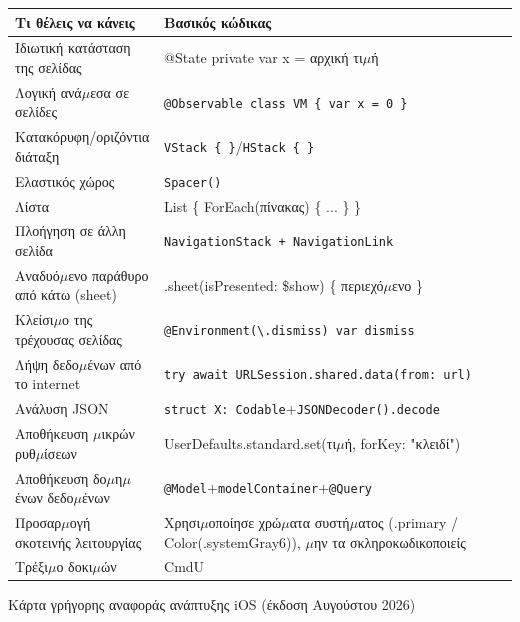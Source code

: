 


\begin{center}
\begin{tabularx}{\linewidth}{|X|X|}
\hline
\textbf{Τι θέλεις να κάνεις} & \textbf{Βασικός κώδικας} \tabularnewline
\hline
Ιδιωτική κατάσταση της σελίδας & @State private var x = αρχική τι$\mu$ή \tabularnewline
Λογική ανά$\mu$εσα σε σελίδες & \texttt{@Observable class VM \{ var x = 0 \}} \tabularnewline
Κατακόρυφη/οριζόντια διάταξη & \texttt{VStack \{ \}}/\texttt{HStack \{ \}} \tabularnewline
Ελαστικός χώρος & \texttt{Spacer()} \tabularnewline
Λίστα & List \{ ForEach(πίνακας) \{ ... \} \} \tabularnewline
Πλοήγηση σε άλλη σελίδα & \texttt{NavigationStack + NavigationLink} \tabularnewline
Αναδυό$\mu$ενο παράθυρο από κάτω (sheet) & .sheet(isPresented: \$show) \{ περιεχό$\mu$ενο \} \tabularnewline
Κλείσι$\mu$ο της τρέχουσας σελίδας & \texttt{@Environment(\textbackslash{}.\allowbreak dismiss) var dismiss} \tabularnewline
Λήψη δεδο$\mu$ένων από το internet & \texttt{try await URLSession.\allowbreak shared.\allowbreak data(from: url)} \tabularnewline
Ανάλυση JSON & \texttt{struct X: Codable}+\texttt{JSONDecoder().\allowbreak decode} \tabularnewline
Αποθήκευση $\mu$ικρών ρυθ$\mu$ίσεων & UserDefaults.standard.set(τι$\mu$ή, forKey: "κλειδί") \tabularnewline
Αποθήκευση δο$\mu$η$\mu$ένων δεδο$\mu$ένων & \texttt{@Model}+\texttt{modelContainer}+\texttt{@Query} \tabularnewline
Προσαρ$\mu$ογή σκοτεινής λειτουργίας & Χρησι$\mu$οποίησε χρώ$\mu$ατα συστή$\mu$ατος (.primary / Color(.systemGray6)), $\mu$ην τα σκληροκωδικοποιείς \tabularnewline
Τρέξι$\mu$ο δοκι$\mu$ών & CmdU \tabularnewline
\hline
\end{tabularx}
\end{center}

\begin{center}\small\color{gray}Κάρτα γρήγορης αναφοράς ανάπτυξης iOS (έκδοση Αυγούστου 2026)\end{center}


